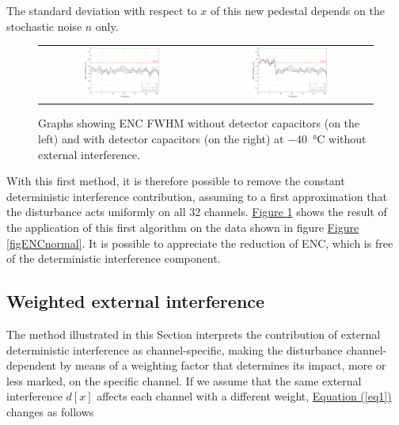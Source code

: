 \noindent
The standard deviation with respect to $x$ of this new pedestal depends on the stochastic noise $n$ only.

\begin{figure}[h!]
    \centering
    \begin{tabular}{cc}
         \includegraphics[width=0.475\textwidth]{Images/chap1/results/ENC_minus40C/ASIC_cold_wocaps_wo_mean.pdf} &  \includegraphics[width=0.475\textwidth]{Images/chap1/results/ENC_minus40C/ASIC_cold_wcaps_wo_mean.pdf} \\
    \end{tabular}
    \caption{Graphs showing ENC FWHM without detector capacitors (on the left) and with detector capacitors (on the right) at \SI{-40}{\celsius} without external interference.}
    \label{figENCwomean}
\end{figure}

\noindent
With this first method, it is therefore possible to remove the constant deterministic interference contribution, assuming to a first approximation that the disturbance acts uniformly on all 32 channels. \hyperref[figENCwomean]{Figure \ref{figENCwomean}} shows the result of the application of this first algorithm on the data shown in figure \hyperref[figENCnormal]{Figure \ref{figENCnormal}}. It is possible to appreciate the reduction of ENC, which is free of the deterministic interference component.

\subsection{Weighted external interference}
The method illustrated in this Section interprets the contribution of external deterministic interference as channel-specific, making the disturbance channel-dependent by means of a weighting factor that determines its impact, more or less marked, on the specific channel. If we assume that the same external interference $d[x]$ affects each channel with a different weight, \hyperref[eq1]{Equation (\ref{eq1})} changes as follows

